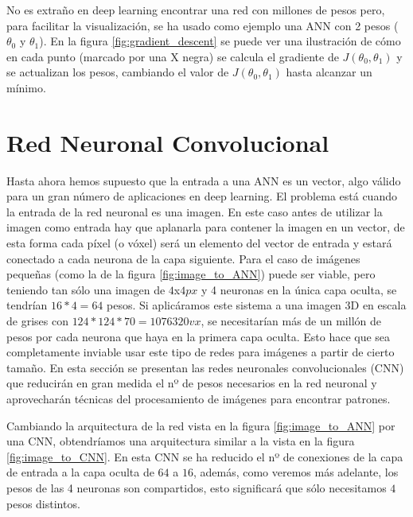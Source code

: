 No es extraño en deep learning encontrar una red con millones de pesos pero, para facilitar la visualización, se ha usado como ejemplo una ANN con 2 pesos ($\theta_0$ y $\theta_1$). En la figura \ref{fig:gradient_descent} se puede ver una ilustración de cómo en cada punto (marcado por una X negra) se calcula el gradiente de $J(\theta_0, \theta_1)$ y se actualizan los pesos, cambiando el valor de $J(\theta_0, \theta_1)$ hasta alcanzar un mínimo.


\section{Red Neuronal Convolucional}\label{sec:archs}

Hasta ahora hemos supuesto que la entrada a una ANN es un vector, algo válido para un gran número de aplicaciones en deep learning. El problema está cuando la entrada de la red neuronal es una imagen. En este caso antes de utilizar la imagen como entrada hay que aplanarla para contener la imagen en un vector, de esta forma cada píxel (o vóxel) será un elemento del vector de entrada y estará conectado a cada neurona de la capa siguiente. Para el caso de imágenes pequeñas (como la de la figura \ref{fig:image_to_ANN}) puede ser viable, pero teniendo tan sólo una imagen de $4$x$4px$ y 4 neuronas en la única capa oculta, se tendrían $16*4=64$ pesos. Si aplicáramos este sistema a una imagen 3D en escala de grises con $124*124*70=1076320vx$, se necesitarían más de un millón de pesos por cada neurona que haya en la primera capa oculta. Esto hace que sea completamente inviable usar este tipo de redes para imágenes a partir de cierto tamaño. En esta sección se presentan las redes neuronales convolucionales (CNN) que reducirán en gran medida el nº de pesos necesarios en la red neuronal y aprovecharán técnicas del procesamiento de imágenes para encontrar patrones.


Cambiando la arquitectura de la red vista en la figura \ref{fig:image_to_ANN} por una CNN, obtendríamos una arquitectura similar a la vista en la figura \ref{fig:image_to_CNN}. En esta CNN se ha reducido el nº de conexiones de la capa de entrada a la capa oculta de $64$ a $16$, además, como veremos más adelante, los pesos de las 4 neuronas son compartidos, esto significará que sólo necesitamos $4$ pesos distintos.

